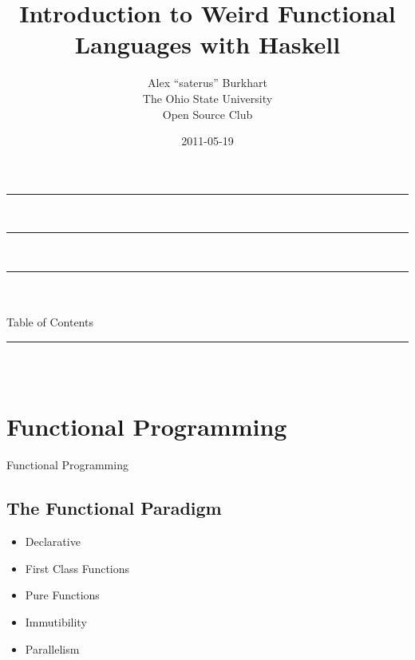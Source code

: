 \documentclass{beamer}                  %
\title{Introduction to Weird Functional Languages with Haskell}    %
\author{
	Alex ``saterus'' Burkhart\\          %
	The Ohio State University\\          %
	Open Source Club                     %
}
\date{2011-05-19}                       %
\newcommand{\srule}{
	\rule{\textwidth}{1pt}\\
}
\newlength{\subsecwidth}
\newenvironment{slide}{
	\begin{frame} %
	\settowidth{\subsecwidth}{\insertsubsection} %
	\ifthenelse{\dimtest{\subsecwidth}{<}{1pt}}{ %
		\frametitle{\insertsection\\             %
		\vspace{-1ex}                            %
		\color{fore}\srule                       %
		\par                                     %
		\vspace{-3ex}                            %
		}
	}{                                           %
		\frametitle{\insertsection\ -- \insertsubsection\\ %
		\vspace{-1ex}                            %
		\color{fore}\srule                       %
		\par                                     %
		\vspace{-3ex}                            %
		}
	}
	\Large                                       %
}{
	\end{frame}
}
\newcommand{\titleslide}[1]{
	\section{#1}             %
	\begin{slide}
		\begin{center}
			\color{comments}
			\Huge            %
			#1               %
		\end{center}
	\end{slide}
}
\begin{document}

\begin{frame}                           %
	\srule                              %
	\titlepage                          %
	\srule                              %
\end{frame}

\begin{frame}                           %
	\begin{center}
		\srule                          %
		\vspace{1ex}
		\color{title} \inserttitle\\\color{fore} Table of Contents
		\srule                          %
	\end{center}
	\begin{columns}                     %
		\begin{column}{.5\textwidth}    %
			\tableofcontents[sections={1-3}] %
		\end{column}
		\begin{column}{.5\textwidth}    %
			\tableofcontents[sections={4-6}] %
		\end{column}
	\end{columns}
\end{frame}


\titleslide{Functional Programming}

\subsection{The Functional Paradigm}
\begin{slide}
  \begin{itemize}
    \item Declarative
    \item First Class Functions
    \item Pure Functions
    \item Immutibility
    \item Parallelism
  \end{itemize}
\end{slide}
\end{document}
